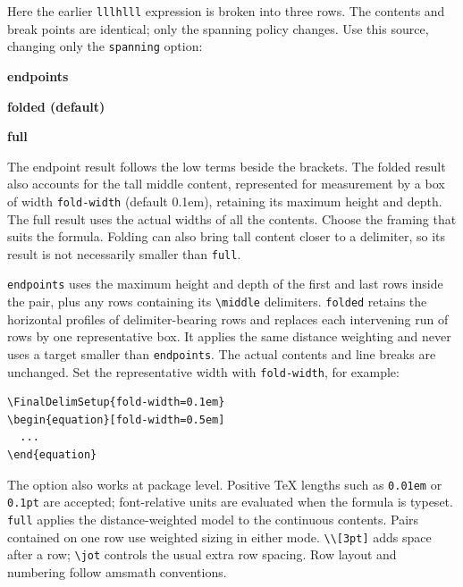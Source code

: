 \documentclass[11pt,a4paper]{article}
\begin{document}
Here the earlier \texttt{lllhlll} expression is broken into three rows.
The contents and break points are identical; only the spanning policy changes.
Use this source, changing only the \texttt{spanning} option:

\begin{center}
\begin{minipage}[t]{.32\linewidth}\vspace{0pt}\centering
\textbf{endpoints}

\end{minipage}\hfill
\begin{minipage}[t]{.32\linewidth}\vspace{0pt}\centering
\textbf{folded (default)}

\end{minipage}\hfill
\begin{minipage}[t]{.32\linewidth}\vspace{0pt}\centering
\textbf{full}

\end{minipage}
\end{center}
The endpoint result follows the low terms beside the brackets. The folded
result also accounts for the tall middle content, represented for measurement
by a box of width \texttt{fold-width} (default 0.1em), retaining its maximum height and depth. The full
result uses the actual widths of all the contents. Choose the framing that
suits the formula. Folding can also bring tall content closer to a delimiter,
so its result is not necessarily smaller than \texttt{full}.

\texttt{endpoints} uses the maximum height and depth of the first and last
rows inside the pair, plus any rows containing its \verb|\middle| delimiters.
\texttt{folded} retains the horizontal profiles of delimiter-bearing rows and
replaces each intervening run of rows by one representative box.
It applies the same distance weighting and never uses a target smaller than
\texttt{endpoints}. The actual contents and line breaks are unchanged.
Set the representative width with \texttt{fold-width}, for example:
\begin{lstlisting}
\FinalDelimSetup{fold-width=0.1em}
\begin{equation}[fold-width=0.5em]
  ...
\end{equation}
\end{lstlisting}
The option also works at package level. Positive TeX lengths such as
\texttt{0.01em} or \texttt{0.1pt} are accepted; font-relative units are
evaluated when the formula is typeset.
\texttt{full} applies the distance-weighted model to the continuous contents.
Pairs contained on one row use weighted sizing in either mode.
\verb|\\[3pt]| adds space after a row; \verb|\jot| controls the usual extra
row spacing. Row layout and numbering follow amsmath conventions.
\end{document}
